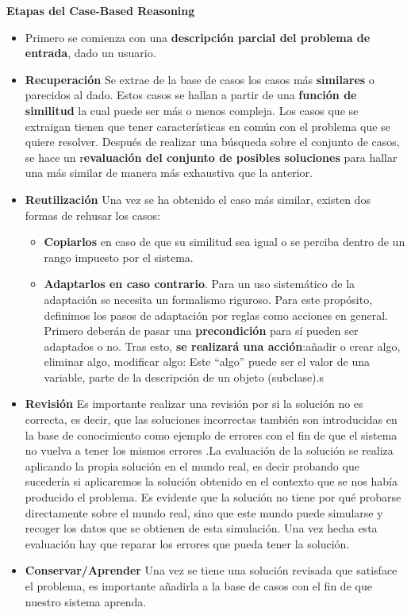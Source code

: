 \textbf{Etapas del Case-Based Reasoning}\cite{CBR-UI}
\begin{itemize}
\item  Primero se comienza con una \textbf{descripción parcial del problema de entrada}, dado un usuario.
\end{itemize}
\begin{itemize}
\item  \textbf{Recuperación}
Se extrae de la base de casos los casos más \textbf{similares} o parecidos al dado. Estos casos se hallan a partir de una \textbf{función de similitud} la cual puede ser más o menos compleja. Los casos que se extraigan tienen que tener características en común con el problema que se quiere resolver. Después de realizar una búsqueda sobre el conjunto de casos, se hace un r\textbf{evaluación del conjunto de posibles soluciones} para hallar una más similar de manera más exhaustiva que la anterior.
\item \textbf{Reutilización}
Una vez se ha obtenido el caso más similar, existen dos formas de rehusar los casos: 
\begin{itemize}
\item  \textbf{Copiarlos} en caso de que su similitud sea igual o se perciba dentro de un rango impuesto por el sistema.
\item \textbf{Adaptarlos en caso contrario}. Para un uso sistemático de la adaptación se necesita un formalismo riguroso. Para este propósito, definimos los pasos de adaptación por reglas como acciones en general. Primero deberán de pasar una \textbf{precondición} para sí pueden ser adaptados o no. Tras esto, \textbf{se realizará una acción}:añadir o crear algo, eliminar algo, modificar algo: Este “algo” puede ser el valor de una variable, parte de la descripción de un objeto (subclase).s
\end{itemize}
\item \textbf{Revisión}
Es importante realizar una revisión por si la solución no es correcta, es decir, que las soluciones incorrectas también son introducidas en la base de conocimiento como ejemplo de errores con el fin de que el sistema no vuelva a tener los mismos errores .La evaluación de la solución se realiza aplicando la propia solución en el mundo real, es decir probando que sucedería si aplicaremos la solución obtenido en el contexto que se nos había producido el problema. Es evidente que la solución no tiene por qué probarse directamente sobre el mundo real, sino que este mundo puede simularse y recoger los datos que se obtienen de esta simulación. Una vez hecha esta evaluación hay que reparar los errores que pueda tener la solución.
\item  \textbf{Conservar/Aprender}
Una vez se tiene una solución revisada que satisface el problema, es importante añadirla a la base de casos con el fin de que nuestro sistema aprenda.
\end{itemize}


